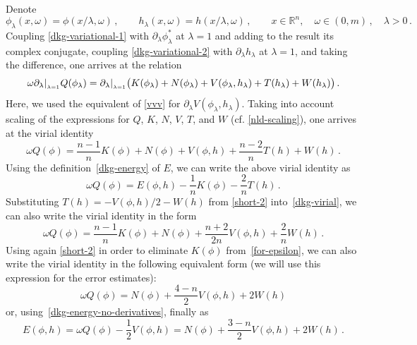 \documentclass[12pt]{extarticle}
\newcommand{\p}{\partial}
\newcommand{\at}[1]{\vert\sb{\sb{#1}}}
\def\R{\mathbb{R}}
\theoremstyle{plain}
\theoremstyle{remark}
\begin{document}
Denote
\[
    \phi_\lambda(x,\omega)=\phi(x/\lambda,\omega)\,,
    \qquad
    h_\lambda(x,\omega)=h(x/\lambda,\omega)\,,
    \qquad
    x\in\R^n,
    \quad\omega\in(0,m)\,,
    \quad
    \lambda>0\,.
\]
Coupling
\eqref{dkg-variational-1}
with
$\p_\lambda\phi_\lambda^*$
at $\lambda=1$
and adding to the result
its complex conjugate,
coupling
\eqref{dkg-variational-2}
with $\p_\lambda h_\lambda$
at $\lambda=1$,
and taking the difference,
one arrives at the relation
\begin{equation}
    \omega \p_\lambda\at{\lambda=1} Q(\phi_\lambda)
    =
    \p_\lambda\at{\lambda=1}
    \bigl(K(\phi_\lambda)+N(\phi_\lambda)
    +V(\phi_\lambda,h_\lambda)
    +T(h_\lambda)+W(h_\lambda)\bigr)\,.
\end{equation}
Here, we used the equivalent of \eqref{vvv}
for $\p_\lambda V(\phi_\lambda,h_\lambda)$.
Taking into account
scaling of the expressions
for $Q$, $K$, $N$, $V$, $T$,
and $W$
(cf. \eqref{nld-scaling}),
one arrives at the
virial identity
\begin{equation}\label{dkg-virial}
    \omega Q(\phi)
    =\frac{n-1}{n}K(\phi)+N(\phi)+V(\phi,h)+\frac{n-2}{n}T(h)+W(h)\,.
\end{equation}
Using the definition~\eqref{dkg-energy} of $E$,
we can write
the above virial identity as
\begin{equation}\label{wcr}
    \omega Q(\phi)
    =E(\phi,h)-\frac{1}{n}K(\phi)-\frac{2}{n}T(h)\,.
\end{equation}
Substituting $T(h)=-V(\phi,h)/2-W(h)$ from \eqref{short-2} into~\eqref{dkg-virial},
we can also write the virial identity
in the form
\begin{equation}\label{for-epsilon}
    \omega Q(\phi)
    =\frac{n-1}{n}K(\phi) + N(\phi) +\frac{n+2}{2n}V(\phi,h)+\frac{2}{n}W(h)\,.
\end{equation}
Using again
\eqref{short-2} in order to eliminate $K(\phi)$ from~\eqref{for-epsilon}, we can also write
the virial identity in the following equivalent form
(we will use this expression
for the error estimates):
\begin{equation}
\label{dkg-virial-noderivatives}
    \omega Q(\phi)
    =
    N(\phi)+\frac{4-n}{2} V(\phi,h) + 2 W(h)
\end{equation}
or, using~\eqref{dkg-energy-no-derivatives}, finally as
\begin{equation}
\label{dkg-virial-noderivatives-with-E}
    E(\phi,h) =\omega Q(\phi)-\frac{1}{2}V(\phi,h) = N(\phi) + \frac{3-n}{2} V(\phi,h) + 2 W(h)\,.
\end{equation}
\end{document}
